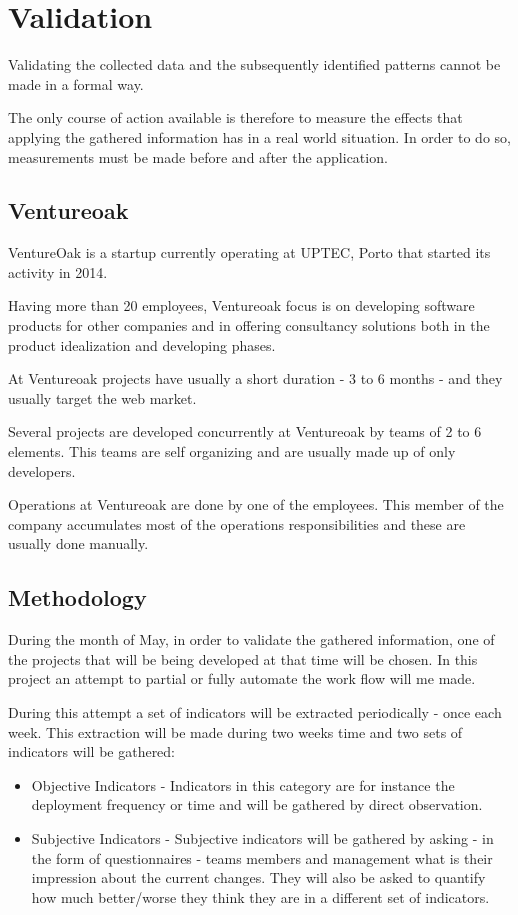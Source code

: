 \chapter{ Validation } \label{chap:validation}
	Validating the collected data and the subsequently identified patterns cannot be made in a formal way.

	The only course of action available is therefore to measure the effects that applying the gathered information has in a real world situation. In order to do so, measurements must be made before and after the application.

	\section{Ventureoak}

	VentureOak is a startup currently operating at UPTEC, Porto that started its activity in 2014. 

	Having more than 20 employees, Ventureoak focus is on developing software products for other companies and in offering consultancy solutions both in the product idealization and developing phases.  

	At Ventureoak projects have usually a short duration - 3 to 6 months - and they usually target the web market.

	Several projects are developed concurrently at Ventureoak by teams of 2 to 6 elements. This teams are self organizing and are usually made up of only developers. 

	Operations at Ventureoak are done by one of the employees. This member of the company accumulates most of the operations responsibilities and these are usually done manually. 

\section{Methodology} \label{chap:validation:sec:methodology}
	
	During the month of May, in order to validate the gathered information, one of the projects that will be being developed at that time will be chosen. In this project an attempt to partial or fully automate the work flow will me made. 

	During this attempt a set of indicators will be extracted periodically - once each week. This extraction will be made during two weeks time and two sets of indicators will be gathered:

	\begin{itemize}
		\item{Objective Indicators} - Indicators in this category are for instance the deployment frequency or time and will be gathered by direct observation.

		\item{Subjective Indicators} - Subjective indicators will be gathered by asking - in the form of 
questionnaires - teams members and management what is their impression about the current changes. They will also be asked to quantify how much better/worse they think they are in a different set of indicators.

	\end{itemize}

